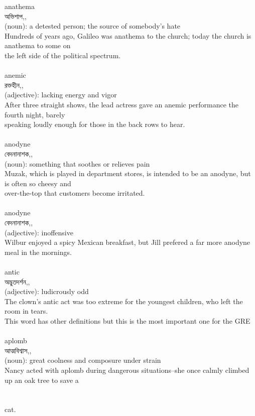 \documentclass{article}
\begin{document}
{anathema}\\
{অভিশাপ,,}\\
{(noun): a detested person; the source of somebody's hate\\Hundreds of years ago, Galileo was anathema to the church; today the church is anathema to some on\\the left side of the political spectrum.\\}\\
{anemic}\\
{রক্তহীন,,}\\
{(adjective): lacking energy and vigor\\After three straight shows, the lead actress gave an anemic performance the fourth night, barely\\speaking loudly enough for those in the back rows to hear.\\}\\
{anodyne}\\
{বেদনানাশক,,}\\
{(noun): something that soothes or relieves pain\\Muzak, which is played in department stores, is intended to be an anodyne, but is often so cheesy and\\over-the-top that customers become irritated.\\}\\
{anodyne}\\
{বেদনানাশক,,}\\
{(adjective): inoffensive\\Wilbur enjoyed a spicy Mexican breakfast, but Jill prefered a far more anodyne meal in the mornings.\\}\\
{antic}\\
{অদ্ভুতদর্শন,,}\\
{(adjective): ludicrously odd\\The clown's antic act was too extreme for the youngest children, who left the room in tears.\\This word has other definitions but this is the most important one for the GRE\\}\\
{aplomb}\\
{আত্মবিশ্বাস,,}\\
{(noun): great coolness and composure under strain\\Nancy acted with aplomb during dangerous situations--she once calmly climbed up an oak tree to save a\\\\                                                                               \\cat.\\}\\
\end{document}
